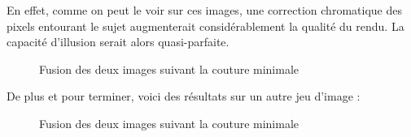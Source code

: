 \documentclass[a4paper]{article}
\begin{document}
En effet, comme on peut le voir sur ces images, une correction chromatique des pixels entourant le sujet augmenterait considérablement la qualité du rendu. La capacité  d'illusion serait alors quasi-parfaite.


\begin{figure}[!ht]%
    \centering
    \hspace{0.030\textwidth}
    \caption{Fusion des deux images suivant la couture minimale}
    \label{resultsA}
\end{figure}

De plus et pour terminer, voici des résultats sur un autre jeu d'image :
\begin{figure}[!ht]%
    \centering
    \hspace{0.030\textwidth}
    \hspace{0.030\textwidth}
    \caption{Fusion des deux images suivant la couture minimale}
    \label{resultsB}
\end{figure}
\end{document}
